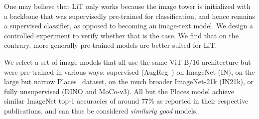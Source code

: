 \documentclass[10pt,twocolumn,letterpaper]{article}
\def \lit {LiT\xspace}
\begin{document}
One may believe that \lit only works because the image tower is initialized with a backbone that was supervisedly pre-trained for classification, and hence remains a supervised classifier, as opposed to becoming an image-text model.
We design a controlled experiment to verify whether that is the case. We find that on the contrary, more generally pre-trained models are better suited for \lit.

We select a set of image models that all use the same ViT-B/16 architecture but were pre-trained in various ways: supervised (AugReg~\cite{augreg}) on ImageNet (IN), on the large but narrow Places~\cite{places365} dataset, on the much broader ImageNet-21k (IN21k), or fully unsupervised (DINO and MoCo-v3).
All but the Places model achieve similar ImageNet top-1 accuracies of around 77\% as reported in their respective publications, and can thus be considered \emph{similarly good} models.
\end{document}
